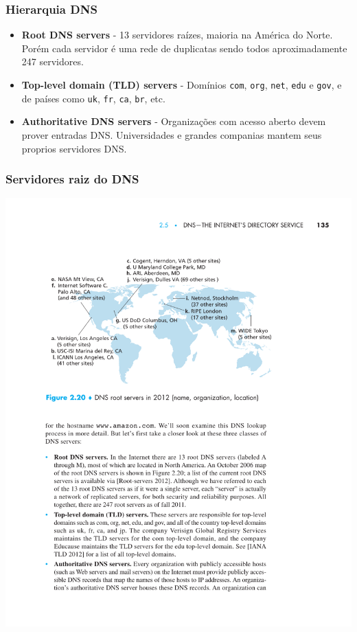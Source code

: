 \documentclass[xcolor=dvipsnames,10pt,compress,aspectratio=169]{beamer}
\begin{document}
\begin{frame}[fragile]
  \frametitle{Hierarquia DNS}
  \begin{itemize}
  \item {\bf Root DNS servers} - 13 servidores raízes, maioria na América do Norte. Porém cada servidor
    é uma rede de duplicatas sendo todos aproximadamente 247 servidores.
  \item {\bf Top-level domain (TLD) servers} - Domínios \verb+com+, \verb+org+, \verb+net+,
    \verb+edu+ e \verb+gov+, e de países como \verb+uk+, \verb+fr+, \verb+ca+, \verb+br+, etc.
  \item {\bf Authoritative DNS servers} - Organizações com acesso aberto devem prover entradas
    DNS. Universidades e grandes companias mantem seus proprios servidores DNS.
  \end{itemize}
\end{frame}

\begin{frame}
  \frametitle{Servidores raiz do DNS}
  \begin{center}
  \includegraphics[scale=0.9]{kurose-02-20}
  \end{center}
\end{frame}
\end{document}
